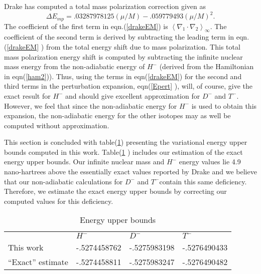 \documentclass[12pt,thmsa]{article}
\begin{document}
Drake\cite{Drake88} has computed a total mass polarization correction given
as 
\begin{equation}
\Delta E_{mp}=.03287978125\left( \mu /M\right) -.059779493\left( \mu
/M\right) ^2.  \label{drakeEM}
\end{equation}
The coefficient of the first term in eqn.(\ref{drakeEM}) is $\left\langle
\nabla _1\cdot \nabla _2\right\rangle _\infty $. The coefficient of the
second term is derived by subtracting the leading term in eqn.(\ref{drakeEM}%
) from the total energy shift due to mass polarization. This total mass
polarization energy shift is computed by subtracting the infinite nuclear
mass energy from the non-adiabatic energy of $H^{-}$ (derived from the
Hamiltonian in eqn(\ref{ham2})). Thus, using the terms in eqn(\ref{drakeEM})
for the second and third terms in the perturbation expansion, eqn(\ref{Epert}%
), will, of course, give the exact result for $H^{-}$ and should give
excellent approximation for $D^{-}$ and $T^{-}$. However, we feel that since
the non-adiabatic energy for $H^{-}$ is used to obtain this expansion, the
non-adiabatic energy for the other isotopes may as well be computed without
approximation.

This section is concluded with table(\ref{boundstab}) presenting the
variational energy upper bounds computed in this work.  Table(\ref{boundstab}%
) includes our estimation of the exact energy upper bounds. Our infinite
nuclear mass and $H^{-}$ energy values lie 4.9 nano-hartrees above the
essentially exact values reported by Drake\cite{Drake88} and we believe that
our non-adiabatic calculations for $D^{-}$ and $T^{-}$contain this same
deficiency. Therefore, we estimate the exact energy upper bounds by
correcting our computed values for this deficiency.

\begin{table}[tbp] \centering%
\begin{tabular}{llll}
\hline\hline
& $H^{-}$ & $D^{-}$ & $T^{-}$ \\ 
This work & -.5274458762 & -.5275983198 & -.5276490433 \\ 
``Exact'' estimate & -.5274458811 & -.5275983247 & -.5276490482 \\ 
\hline\hline
\end{tabular}
\caption{Energy upper bounds \label{boundstab}}%
\end{table}%
\end{document}
